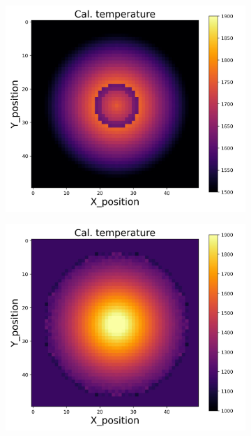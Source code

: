 {\begin{figure}[p]
\begin{minipage}{\textwidth}
\begin{subfigure}{0.325\textwidth}
        \end{subfigure}
        \begin{subfigure}{0.325\textwidth}
            \centering
            \includegraphics[width=\textwidth]{figures/raw_data/5/mix/T_cal.jpg}
        \end{subfigure}
        \begin{subfigure}{0.325\textwidth}
            \centering
            \includegraphics[width=\textwidth]{figures/raw_data/21/mix/T_cal.jpg}

\end{subfigure}
\end{minipage}
\end{figure}}

